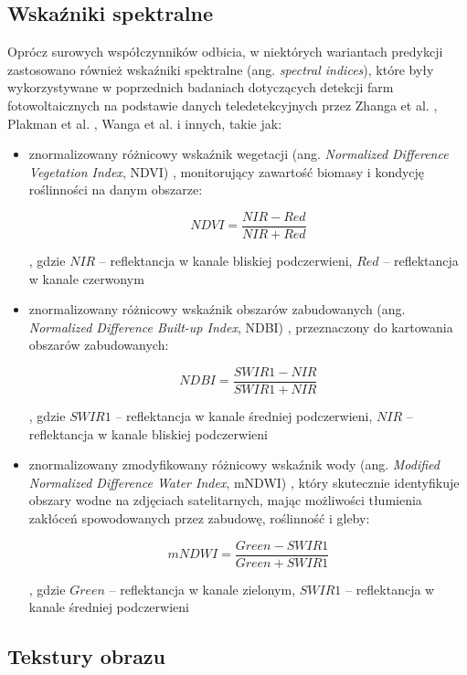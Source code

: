 \documentclass{amuthesis}
\begin{document}
\hypertarget{sec-spectral-indices}{%
\subsection{Wskaźniki spektralne}\label{sec-spectral-indices}}

Oprócz surowych współczynników odbicia, w niektórych wariantach
predykcji zastosowano również wskaźniki spektralne (ang. \emph{spectral
indices}), które były wykorzystywane w poprzednich badaniach dotyczących
detekcji farm fotowoltaicznych na podstawie danych teledetekcyjnych
przez Zhanga et al. \autocite*{zhang_2021_texture}, Plakman et al.
\autocite*{plakman_2022_pv}, Wanga et al. \autocite*{wang_2022_pv} i
innych, takie jak:

\begin{itemize}
\item
  znormalizowany różnicowy wskaźnik wegetacji (ang. \emph{Normalized
  Difference Vegetation Index}, NDVI) \autocite{ndvi}, monitorujący
  zawartość biomasy i kondycję roślinności na danym obszarze:

  \[
  NDVI = \frac{NIR - Red}{NIR + Red}
  \]

  , gdzie \(NIR\) -- reflektancja w kanale bliskiej podczerwieni,
  \(Red\) -- reflektancja w kanale czerwonym
\item
  znormalizowany różnicowy wskaźnik obszarów zabudowanych (ang.
  \emph{Normalized Difference Built-up Index}, NDBI) \autocite{ndbi},
  przeznaczony do kartowania obszarów zabudowanych:

  \[
  NDBI = \frac{SWIR1 - NIR}{SWIR1 + NIR}
  \]

  , gdzie \(SWIR1\) -- reflektancja w kanale średniej podczerwieni,
  \(NIR\) -- reflektancja w kanale bliskiej podczerwieni
\item
  znormalizowany zmodyfikowany różnicowy wskaźnik wody (ang.
  \emph{Modified Normalized Difference Water Index}, mNDWI)
  \autocite{mndwi}, który skutecznie identyfikuje obszary wodne na
  zdjęciach satelitarnych, mając możliwości tłumienia zakłóceń
  spowodowanych przez zabudowę, roślinność i gleby:

  \[
  mNDWI = \frac{Green - SWIR1}{Green + SWIR1}
  \]

  , gdzie \(Green\) -- reflektancja w kanale zielonym, \(SWIR1\) --
  reflektancja w kanale średniej podczerwieni
\end{itemize}

\hypertarget{sec-textures}{%
\subsection{Tekstury obrazu}\label{sec-textures}}
\end{document}
